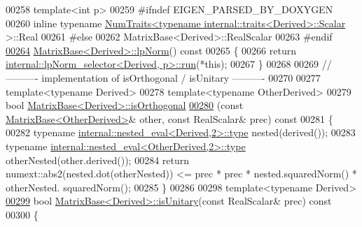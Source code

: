 \begin{DoxyCode}
00258 \textcolor{keyword}{template}<\textcolor{keywordtype}{int} p>
00259 \textcolor{preprocessor}{#ifndef EIGEN\_PARSED\_BY\_DOXYGEN}
00260 \textcolor{keyword}{inline} \textcolor{keyword}{typename} \hyperlink{group___core___module_struct_eigen_1_1_num_traits}{NumTraits<typename internal::traits<Derived>::Scalar}
      >::Real
00261 \textcolor{preprocessor}{#else}
00262 MatrixBase<Derived>::RealScalar
00263 \textcolor{preprocessor}{#endif}
\hyperlink{group___core___module_aca6bcf9d89ffab92d572929b151bd8a2}{00264} \hyperlink{group___core___module_class_eigen_1_1_matrix_base}{MatrixBase<Derived>::lpNorm}()\textcolor{keyword}{ const}
00265 \textcolor{keyword}{}\{
00266   \textcolor{keywordflow}{return} \hyperlink{struct_eigen_1_1internal_1_1lp_norm__selector}{internal::lpNorm\_selector<Derived, p>::run}(*\textcolor{keyword}{this});
00267 \}
00268 
00269 \textcolor{comment}{//---------- implementation of isOrthogonal / isUnitary ----------}
00270 
00277 \textcolor{keyword}{template}<\textcolor{keyword}{typename} Derived>
00278 \textcolor{keyword}{template}<\textcolor{keyword}{typename} OtherDerived>
00279 \textcolor{keywordtype}{bool} \hyperlink{group___core___module_aefdc8e4e4c156fdd79a21479e75dcd8a}{MatrixBase<Derived>::isOrthogonal}
\hyperlink{group___core___module_aefdc8e4e4c156fdd79a21479e75dcd8a}{00280} (\textcolor{keyword}{const} \hyperlink{group___core___module_class_eigen_1_1_matrix_base}{MatrixBase<OtherDerived>}& other, \textcolor{keyword}{const} RealScalar& prec) \textcolor{keyword}{const}
00281 \{
00282   \textcolor{keyword}{typename} \hyperlink{class_eigen_1_1internal_1_1_tensor_lazy_evaluator_writable}{internal::nested\_eval<Derived,2>::type} nested(derived());
00283   \textcolor{keyword}{typename} \hyperlink{class_eigen_1_1internal_1_1_tensor_lazy_evaluator_writable}{internal::nested\_eval<OtherDerived,2>::type} 
      otherNested(other.derived());
00284   \textcolor{keywordflow}{return} numext::abs2(nested.dot(otherNested)) <= prec * prec * nested.squaredNorm() * otherNested.
      squaredNorm();
00285 \}
00286 
00298 \textcolor{keyword}{template}<\textcolor{keyword}{typename} Derived>
\hyperlink{group___core___module_a8a7ee34ce202cac3eeea9cf20c9e4833}{00299} \textcolor{keywordtype}{bool} \hyperlink{group___core___module_a8a7ee34ce202cac3eeea9cf20c9e4833}{MatrixBase<Derived>::isUnitary}(\textcolor{keyword}{const} RealScalar& prec)\textcolor{keyword}{ const}
00300 \textcolor{keyword}{}\{

\end{DoxyCode}
